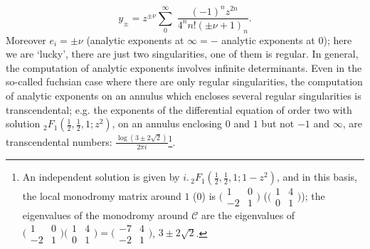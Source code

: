 \begin{para}
\begin{equation*}
 y_\pm= z^{\pm\nu}\sum_0^\infty \;\frac{\;(-1)^n z^{2n }}{4^n n! (\pm\nu
  +1)_n}. 
\end{equation*}
 Moreover $e_i = \pm \nu$ (analytic exponents at $\infty = -$ analytic
 exponents at $0$); here we are `lucky', there are just two
 singularities, one of them is regular. In general, the computation of
 analytic exponents involves infinite determinants. Even in the
 so-called fuchsian case where there are only regular singularities, the
 computation of analytic exponents on an annulus which encloses several
 regular singularities is transcendental; e.g. the exponents of the
 differential equation of order two with solution
 ${}_2F_{1}(\frac{1}{2},\frac{1}{2},1;z^2)$, on an 
 annulus enclosing $0$ and $1$ but not $-1$ and
 $\infty$, are transcendental numbers:
 $\frac{\log(3\pm 2\sqrt 2)}{2\pi i}$\footnote{An independent
 solution is given by $i. \,{}_2F_{1}(\frac{1}{2}, \frac{1}{2}, 1;
 1-z^2)$, and in this basis, the local monodromy matrix 
 around $1$ (\resp $0$) is
 $\bigl(\begin{smallmatrix}1&0\\ -2&1\end{smallmatrix}\bigr)$
 (\resp $\bigl(\begin{smallmatrix}1&4\\0&1\end{smallmatrix}\bigr)$); the
 eigenvalues of the 
 monodromy around $\mathcal{C}$ are the eigenvalues of 
 $\bigl(\begin{smallmatrix}1&0\\-2&1\end{smallmatrix}\bigr)
  \bigl(\begin{smallmatrix}1&4\\0&1\end{smallmatrix}\bigr)
  =\bigl(\begin{smallmatrix}-7&4\\-2&1\end{smallmatrix}\bigr)$, 
 \ie $3\pm 2\sqrt 2$.}.
\end{para}

